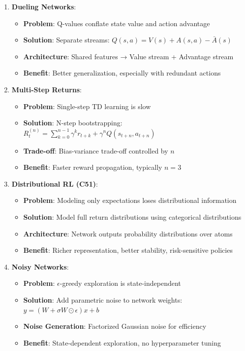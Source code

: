 \documentclass[12pt]{article}
\begin{document}
{{\begin{enumerate}
\item \textbf{Dueling Networks}:
\begin{itemize}
\item \textbf{Problem}: Q-values conflate state value and action advantage
\item \textbf{Solution}: Separate streams: $Q(s,a) = V(s) + A(s,a) - \bar{A}(s)$
\item \textbf{Architecture}: Shared features → Value stream + Advantage stream
\item \textbf{Benefit}: Better generalization, especially with redundant actions
\end{itemize}

\item \textbf{Multi-Step Returns}:
\begin{itemize}
\item \textbf{Problem}: Single-step TD learning is slow
\item \textbf{Solution}: N-step bootstrapping: $R_t^{(n)} = \sum_{k=0}^{n-1} \gamma^k r_{t+k} + \gamma^n Q(s_{t+n}, a_{t+n})$
\item \textbf{Trade-off}: Bias-variance trade-off controlled by $n$
\item \textbf{Benefit}: Faster reward propagation, typically $n=3$
\end{itemize}

\item \textbf{Distributional RL (C51)}:
\begin{itemize}
\item \textbf{Problem}: Modeling only expectations loses distributional information
\item \textbf{Solution}: Model full return distributions using categorical distributions
\item \textbf{Architecture}: Network outputs probability distributions over atoms
\item \textbf{Benefit}: Richer representation, better stability, risk-sensitive policies
\end{itemize}

\item \textbf{Noisy Networks}:
\begin{itemize}
\item \textbf{Problem}: $\epsilon$-greedy exploration is state-independent
\item \textbf{Solution}: Add parametric noise to network weights: $y = (W + \sigma W \odot \epsilon)x + b$
\item \textbf{Noise Generation}: Factorized Gaussian noise for efficiency
\item \textbf{Benefit}: State-dependent exploration, no hyperparameter tuning
\end{itemize}
\end{enumerate}

}}
\end{document}
